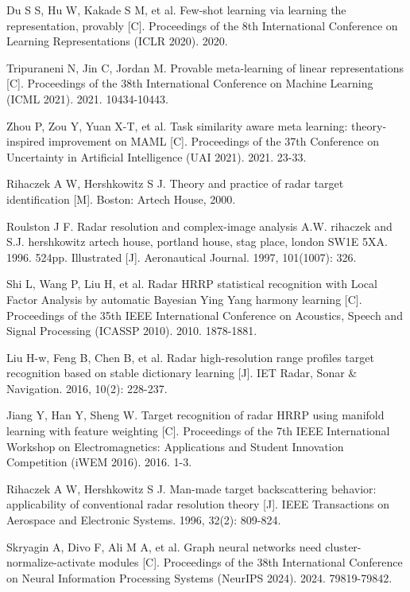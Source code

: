 \documentclass[doctor,twoside,ttf]{nudtpaper}
\begin{document}
\begin{thebibliography}{99}
 Du S S, Hu W, Kakade S M, et al. Few-shot learning via learning the representation, provably [C]. Proceedings of the 8th International Conference on Learning Representations (ICLR 2020). 2020.

 Tripuraneni N, Jin C, Jordan M. Provable meta-learning of linear representations [C]. Proceedings of the 38th International Conference on Machine Learning (ICML 2021). 2021. 10434-10443.

 Zhou P, Zou Y, Yuan X-T, et al. Task similarity aware meta learning: theory-inspired improvement on MAML [C]. Proceedings of the 37th Conference on Uncertainty in Artificial Intelligence (UAI 2021). 2021. 23-33.

 Rihaczek A W, Hershkowitz S J. Theory and practice of radar target identification [M]. Boston: Artech House, 2000.

 Roulston J F. Radar resolution and complex-image analysis A.W. rihaczek and S.J. hershkowitz artech house, portland house, stag place, london SW1E 5XA. 1996. 524pp. Illustrated [J]. Aeronautical Journal. 1997, 101(1007): 326.

 Shi L, Wang P, Liu H, et al. Radar HRRP statistical recognition with Local Factor Analysis by automatic Bayesian Ying Yang harmony learning [C]. Proceedings of the 35th IEEE International Conference on Acoustics, Speech and Signal Processing (ICASSP 2010). 2010. 1878-1881.

 Liu H-w, Feng B, Chen B, et al. Radar high-resolution range profiles target recognition based on stable dictionary learning [J]. IET Radar, Sonar \& Navigation. 2016, 10(2): 228-237.

 Jiang Y, Han Y, Sheng W. Target recognition of radar HRRP using manifold learning with feature weighting [C]. Proceedings of the 7th IEEE International Workshop on Electromagnetics: Applications and Student Innovation Competition (iWEM 2016). 2016. 1-3.

 Rihaczek A W, Hershkowitz S J. Man-made target backscattering behavior: applicability of conventional radar resolution theory [J]. IEEE Transactions on Aerospace and Electronic Systems. 1996, 32(2): 809-824.

 Skryagin A, Divo F, Ali M A, et al. Graph neural networks need cluster-normalize-activate modules [C]. Proceedings of the 38th International Conference on Neural Information Processing Systems (NeurIPS 2024). 2024. 79819-79842.


\end{thebibliography}
\end{document}
